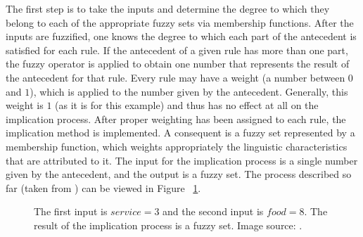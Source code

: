 The first step is to take the inputs and determine the degree to which they belong to each of the appropriate fuzzy sets via membership functions. After the inputs are fuzzified, one knows the degree to which each part of the antecedent is satisfied for each rule. If the antecedent of a given rule has more than one part, the fuzzy operator is applied to obtain one number that represents the result of the antecedent for that rule. Every rule may have a weight (a number between $0$ and $1$), which is applied to the number given by the antecedent. Generally, this weight is $1$ (as it is for this example) and thus has no effect at all on the implication process. After proper weighting has been assigned to each rule, the implication method is implemented. A consequent is a fuzzy set represented by a membership function, which weights appropriately the linguistic characteristics that are attributed to it. The input for the implication process is a single number given by the antecedent, and the output is a fuzzy set. The process described so far (taken from \cite{website:fuzzyinference}) can be viewed in Figure ~\ref{fig:fuzzyimplication}.
\begin{figure}[h!]
\centerline{}
      \caption[Fuzzy inference example.]{The first input is $service=3$ and the second input is $food=8$. The result of the implication process is a fuzzy set. Image source: \cite{website:fuzzyinference}. }
\label{fig:fuzzyimplication}
\end{figure}

